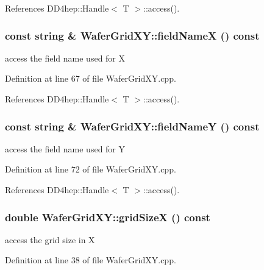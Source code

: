 References DD4hep::Handle$<$ T $>$::access().\hypertarget{class_d_d4hep_1_1_geometry_1_1_wafer_grid_x_y_af40e5b49f57761abb0c6a100257655f8}{
\subsubsection[{fieldNameX}]{\setlength{\rightskip}{0pt plus 5cm}const {\bf string} \& WaferGridXY::fieldNameX () const}}
\label{class_d_d4hep_1_1_geometry_1_1_wafer_grid_x_y_af40e5b49f57761abb0c6a100257655f8}


access the field name used for X 

Definition at line 67 of file WaferGridXY.cpp.

References DD4hep::Handle$<$ T $>$::access().\hypertarget{class_d_d4hep_1_1_geometry_1_1_wafer_grid_x_y_a05aa07ed5eb1190b85a79d8cc27f8e89}{
\subsubsection[{fieldNameY}]{\setlength{\rightskip}{0pt plus 5cm}const {\bf string} \& WaferGridXY::fieldNameY () const}}
\label{class_d_d4hep_1_1_geometry_1_1_wafer_grid_x_y_a05aa07ed5eb1190b85a79d8cc27f8e89}


access the field name used for Y 

Definition at line 72 of file WaferGridXY.cpp.

References DD4hep::Handle$<$ T $>$::access().\hypertarget{class_d_d4hep_1_1_geometry_1_1_wafer_grid_x_y_a02926ad2edf9677447a54108a95b6187}{
\subsubsection[{gridSizeX}]{\setlength{\rightskip}{0pt plus 5cm}double WaferGridXY::gridSizeX () const}}
\label{class_d_d4hep_1_1_geometry_1_1_wafer_grid_x_y_a02926ad2edf9677447a54108a95b6187}


access the grid size in X 

Definition at line 38 of file WaferGridXY.cpp.

